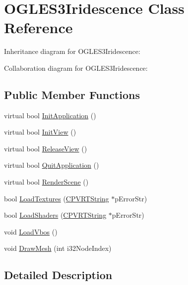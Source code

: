 \hypertarget{class_o_g_l_e_s3_iridescence}{\section{O\+G\+L\+E\+S3\+Iridescence Class Reference}
\label{class_o_g_l_e_s3_iridescence}
}


Inheritance diagram for O\+G\+L\+E\+S3\+Iridescence\+:


Collaboration diagram for O\+G\+L\+E\+S3\+Iridescence\+:
\subsection*{Public Member Functions}
\begin{DoxyCompactItemize}
\item 
virtual bool \hyperlink{class_o_g_l_e_s3_iridescence_a0edebb27542a83bb911e2afdba94a9a5}{Init\+Application} ()
\item 
virtual bool \hyperlink{class_o_g_l_e_s3_iridescence_a600d06d0497dc72131f68578283faa01}{Init\+View} ()
\item 
virtual bool \hyperlink{class_o_g_l_e_s3_iridescence_a04d0d182de35f0d4f8f71077368d1b83}{Release\+View} ()
\item 
virtual bool \hyperlink{class_o_g_l_e_s3_iridescence_abd95527ce2ffbd1dca59cb6c74650f50}{Quit\+Application} ()
\item 
virtual bool \hyperlink{class_o_g_l_e_s3_iridescence_a2980cce0454c2aa853d5a48308737f6c}{Render\+Scene} ()
\item 
bool \hyperlink{class_o_g_l_e_s3_iridescence_a13588a3f27638518620b96a963f042d8}{Load\+Textures} (\hyperlink{class_c_p_v_r_t_string}{C\+P\+V\+R\+T\+String} $\ast$p\+Error\+Str)
\item 
bool \hyperlink{class_o_g_l_e_s3_iridescence_a3db24c55a3271d075bd76dc161d39c04}{Load\+Shaders} (\hyperlink{class_c_p_v_r_t_string}{C\+P\+V\+R\+T\+String} $\ast$p\+Error\+Str)
\item 
void \hyperlink{class_o_g_l_e_s3_iridescence_ab5a5e48da79ea55468ece21f9a177c89}{Load\+Vbos} ()
\item 
void \hyperlink{class_o_g_l_e_s3_iridescence_af9b82357185d7ee43a2d36a1dc69cda7}{Draw\+Mesh} (int i32\+Node\+Index)
\end{DoxyCompactItemize}


\subsection{Detailed Description}


